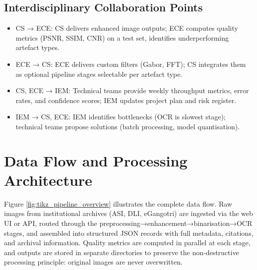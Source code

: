 \subsection{Interdisciplinary Collaboration Points}

\begin{itemize}
	\item CS → ECE: CS delivers enhanced image outputs; ECE computes quality metrics (PSNR, SSIM, CNR) on a test set, identifies underperforming artefact types.
	
	\item ECE → CS: ECE delivers custom filters (Gabor, FFT); CS integrates them as optional pipeline stages selectable per artefact type.
	
	\item CS, ECE → IEM: Technical teams provide weekly throughput metrics, error rates, and confidence scores; IEM updates project plan and risk register.
	
	\item IEM → CS, ECE: IEM identifies bottlenecks (OCR is slowest stage); technical teams propose solutions (batch processing, model quantisation).
\end{itemize}

\section{Data Flow and Processing Architecture}

Figure \ref{fig:tikz_pipeline_overview} illustrates the complete data flow. Raw images from institutional archives (ASI, DLI, eGangotri) are ingested via the web UI or API, routed through the preprocessing→enhancement→binarisation→OCR stages, and assembled into structured JSON records with full metadata, citations, and archival information. Quality metrics are computed in parallel at each stage, and outputs are stored in separate directories to preserve the non-destructive processing principle: original images are never overwritten.

